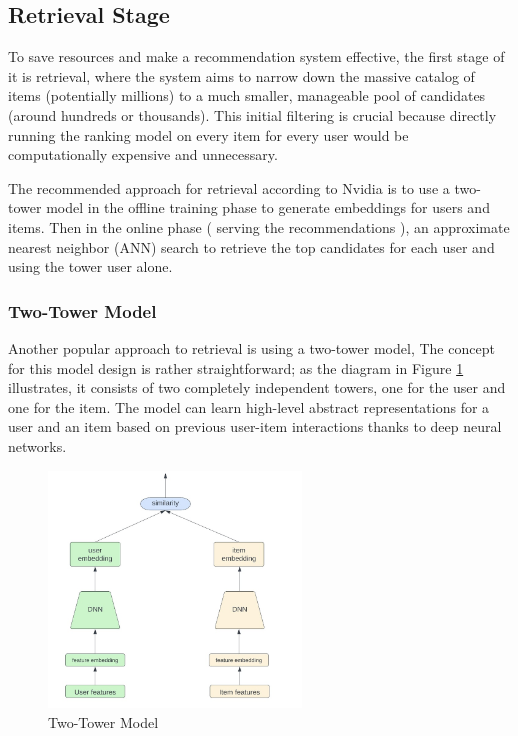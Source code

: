 \subsection{Retrieval Stage}

To save resources and make a recommendation system effective, the first stage of it is retrieval, 
where the system aims to narrow down the massive 
catalog of items (potentially millions) to a much smaller, 
manageable pool of candidates (around hundreds or thousands).
This initial filtering is crucial because 
directly running the ranking model on every item for every 
user would be computationally expensive and unnecessary.

The recommended approach for retrieval according to Nvidia \cite{NvidiaFeatureStores} is to use a two-tower model in the offline training phase to generate embeddings for users and items.
Then in the online phase ( serving the recommendations ), an approximate nearest neighbor (ANN) search to retrieve the top candidates for each user and using the tower user alone.

\subsubsection{Two-Tower Model}

Another popular approach to retrieval is using a two-tower model, 
The concept for this model design is rather straightforward; as the diagram in Figure \ref{fig:TwoTowerModel} illustrates, it consists of two completely independent towers, 
one for the user and one for the item. 
The model can learn high-level abstract representations for a user and an item 
based on previous user-item interactions thanks to deep neural networks. 

\begin{figure}[H]
    \centering
    \includegraphics[width=0.6\textwidth]{assets/two_tower.jpeg}
    \caption[Two-Tower Model]{Two-Tower Model \cite{TwoTowerInRecSys}}
    \label{fig:TwoTowerModel}
\end{figure}

